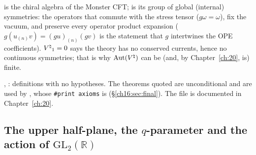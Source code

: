 \begin{physics}
 is the chiral algebra of the Monster CFT;  is its group of global (internal) symmetries:
the operators that commute with the stress tensor ($g\omega=\omega$), fix the vacuum, and preserve every operator
product expansion ($g(u_{(n)}v)=(gu)_{(n)}(gv)$ is the statement that $g$ intertwines the OPE coefficients).
${V^{\natural}}_1=0$ says the theory has no conserved currents, hence no continuous symmetries; that is why $\operatorname{Aut}({V^{\natural}})$ can
be (and, by Chapter~\ref{ch:20}, is) finite.
\end{physics}
\begin{status}
, : definitions with no hypotheses.  The theorems quoted are unconditional and are used by
, whose \texttt{\#print axioms} is 
(\S\ref{ch16:sec:final}).  The file  is documented in Chapter~\ref{ch:20}.
\end{status}

\subsection{The upper half-plane, the \texorpdfstring{$q$}{q}-parameter and the action of \texorpdfstring{$\mathrm{GL}_2(\mathbb{R})$}{GL2(R)}}\label{ch16:sec:analytic}

